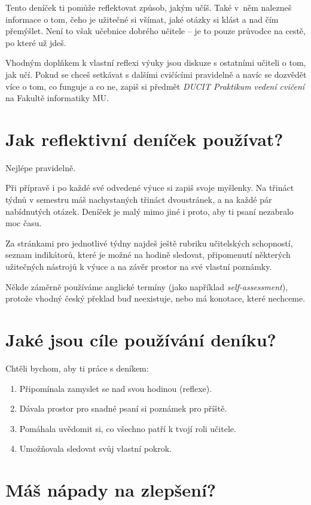 \documentclass[twoside,openany]{book}
\begin{document}
Tento deníček ti pomůže reflektovat způsob, jakým učíš. Také v~něm nalezneš informace o tom, čeho je užitečné si všímat, jaké otázky si klást a nad čím přemýšlet. Není to však učebnice dobrého učitele -- je to pouze průvodce na cestě, po které už jdeš.

Vhodným doplňkem k vlastní reflexi výuky jsou diskuze s ostatními učiteli o tom, jak učí. Pokud se chceš setkávat s dalšími cvičícími pravidelně a navíc se dozvědět více o tom, co funguje a co ne, zapiš si předmět \textit{DUCIT Praktikum vedení cvičení} na Fakultě informatiky MU.

\newpage
\section*{Jak reflektivní deníček používat?}

Nejlépe pravidelně.

Při přípravě i po každé své odvedené výuce si zapiš svoje myšlenky. Na třináct týdnů v semestru máš nachystaných třináct dvoustránek, a na každé pár nabídnutých otázek. Deníček je malý mimo jiné i proto, aby ti psaní nezabralo moc času.

Za stránkami pro jednotlivé týdny najdeš ještě rubriku učitelských schopností, seznam indikátorů, které je možné na hodině sledovat, připomenutí některých užitečných nástrojů k výuce a na závěr prostor na své vlastní poznámky.

Někde záměrně používáme anglické termíny (jako například \textit{self-assessment}), protože vhodný český překlad buď neexistuje, nebo má konotace, které nechceme.

\section*{Jaké jsou cíle používání deníku?}

Chtěli bychom, aby ti práce s deníkem:
\begin{enumerate}[topsep=0pt]
\item Připomínala zamyslet se nad svou hodinou (reflexe).
\item Dávala prostor pro snadné psaní si poznámek pro příště.
\item Pomáhala uvědomit si, co všechno patří k tvojí roli učitele.
\item Umožňovala sledovat svůj vlastní pokrok.
\end{enumerate}

\section*{Máš nápady na zlepšení?}
\end{document}

